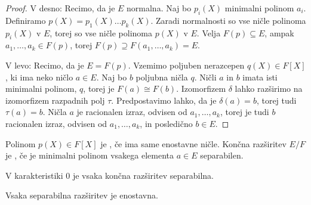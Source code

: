 \begin{proof}
  V desno:
  Recimo, da je $E$ normalna.
  Naj bo $p_i(X)$ minimalni polinom $a_i$.
  Definiramo $p(X) = p_1(X) \ldots p_k(X)$.
  Zaradi normalnosti so vse ničle polinoma $p_i(X)$ v $E$, torej so vse ničle
  polinoma $p(X)$ v $E$.
  Velja $F(p) \subseteq E$, ampak $a_1, \ldots, a_k \in F(p)$, torej $F(p)
  \supseteq F(a_1, \ldots, a_k) = E$.

  V levo:
  Recimo, da je $E = F(p)$.
  Vzemimo poljuben nerazcepen $q(X) \in F[X]$, ki ima neko ničlo $a \in E$.
  Naj bo $b$ poljubna ničla $q$.
  Ničli $a$ in $b$ imata isti minimalni polinom, $q$, torej je $F(a) \cong
  F(b)$.
  Izomorfizem $\delta$ lahko razširimo na izomorfizem razpadnih polj $\tau$.
  Predpostavimo lahko, da je $\delta(a) = b$, torej tudi $\tau(a) = b$.
  Ničla $a$ je racionalen izraz, odvisen od $a_1, \ldots, a_k$, torej je tudi
  $b$ racionalen izraz, odvisen od $a_1, \ldots, a_k$, in posledično $b \in E$.
\end{proof}


\begin{definicija}
  Polinom $p(X) \in F[X]$ je , če ima same enostavne ničle.
  Končna razširitev $E/F$ je , če je minimalni polinom
  vsakega elementa $a \in E$ separabilen.
\end{definicija}

\begin{opomba}
  V karakteristiki $0$ je vsaka končna razširitev separabilna.
\end{opomba}

\begin{izrek}
  Vsaka separabilna razširitev je enostavna.
\end{izrek}

